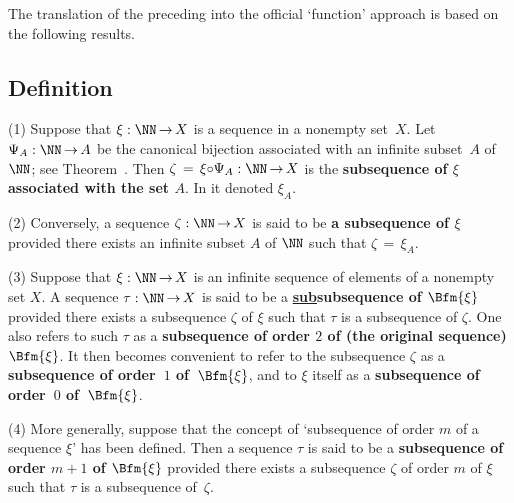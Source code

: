 {\V

        The translation of the preceding into the official `function' approach is based on the following results.

\V

        \subsection{\small{{\bf Definition}}}
        \label{DefA40.40}

\hspace*{\parindent}(1) Suppose that ${\xi}:{\NN} \,{\rightarrow}\, X$ is a sequence in a nonempty set~$X$.
    Let ${\Psi}_{A}:{\NN} \,{\rightarrow}\, A$ be the canonical bijection associated with an infinite subset~$A$ of ${\NN}$; see Theorem~.
    Then ${\zeta} \,=\, {\xi}{\circ}{\Psi}_{A}:{\NN} \,{\rightarrow}\, X$ is the {\bf subsequence of ${\xi}$ associated with the set 
    $A$}. In {\ThisText} it denoted ${\xi}_{A}$.


\V

        (2) Conversely, a sequence ${\zeta}:{\NN} \,{\rightarrow}\, X$ is said to be {\bf a subsequence of ${\xi}$} provided there exists an infinite subset $A$ of ${\NN}$ such that ${\zeta} \,=\, {\xi}_{A}$.

\V

        (3) Suppose that ${\xi}:{\NN} \,{\rightarrow}\, X$ is an infinite sequence of elements of a nonempty set $X$.
    A sequence ${\tau}:{\NN} \,{\rightarrow}\, X$ is said to be a {\bf \underline{sub}subsequence of $\Bfm{{\xi}}$}
    provided there exists a subsequence ${\zeta}$ of ${\xi}$ such that ${\tau}$ is a subsequence of ${\zeta}$.
    One also refers to such ${\tau}$ as a {\bf subsequence of order $2$ of (the original sequence) $\Bfm{{\xi}}$}.
    It then becomes convenient to refer to the subsequence ${\zeta}$ as a {\bf subsequence of order~$1$ of~$\Bfm{{\xi}}$},
and to ${\xi}$ itself as a {\bf subsequence of order~$0$ of~$\Bfm{{\xi}}$}.

\V

       (4)
    More generally, suppose that the concept of `subsequence of order $m$ of a sequence ${\xi}$' has been defined.
    Then a sequence ${\tau}$ is said to be a {\bf subsequence of order $m+1$ of $\Bfm{{\xi}}$}
    provided there exists a subsequence ${\zeta}$ of order $m$ of ${\xi}$ such that ${\tau}$ is a subsequence of~${\zeta}$.

}
